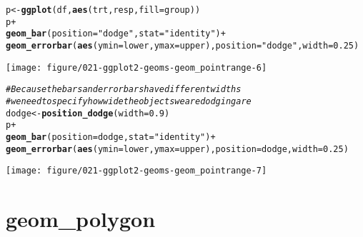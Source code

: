 \documentclass[a4paper,titlepage]{tufte-handout}\usepackage[]{graphicx}\usepackage[]{color}
\makeatletter
\def\maxwidth{ %
  \ifdim\Gin@nat@width>\linewidth
    \linewidth
  \else
    \Gin@nat@width
  \fi
}
\newcommand{\hlnum}[1]{\textcolor[rgb]{0.686,0.059,0.569}{#1}}%
\newcommand{\hlstr}[1]{\textcolor[rgb]{0.192,0.494,0.8}{#1}}%
\newcommand{\hlcom}[1]{\textcolor[rgb]{0.678,0.584,0.686}{\textit{#1}}}%
\newcommand{\hlopt}[1]{\textcolor[rgb]{0,0,0}{#1}}%
\newcommand{\hlstd}[1]{\textcolor[rgb]{0.345,0.345,0.345}{#1}}%
\newcommand{\hlkwb}[1]{\textcolor[rgb]{0.69,0.353,0.396}{#1}}%
\newcommand{\hlkwc}[1]{\textcolor[rgb]{0.333,0.667,0.333}{#1}}%
\newcommand{\hlkwd}[1]{\textcolor[rgb]{0.737,0.353,0.396}{\textbf{#1}}}%
\newenvironment{kframe}{%
 \def\at@end@of@kframe{}%
 \ifinner\ifhmode%
  \def\at@end@of@kframe{\end{minipage}}%
  \begin{minipage}{\columnwidth}%
 \fi\fi%
 \def\FrameCommand##1{\hskip\@totalleftmargin \hskip-\fboxsep
 \colorbox{shadecolor}{##1}\hskip-\fboxsep
     \hskip-\linewidth \hskip-\@totalleftmargin \hskip\columnwidth}%
 \MakeFramed {\advance\hsize-\width
   \@totalleftmargin\z@ \linewidth\hsize
   \@setminipage}}%
 {\par\unskip\endMakeFramed%
 \at@end@of@kframe}
\newenvironment{knitrout}{}{} %
\makeatother
\begin{document}
\begin{knitrout}
\begin{kframe}
\begin{alltt}
\hlstd{p} \hlkwb{<-} \hlkwd{ggplot}\hlstd{(df,} \hlkwd{aes}\hlstd{(trt, resp,} \hlkwc{fill} \hlstd{= group))}
\hlstd{p} \hlopt{+}
 \hlkwd{geom_bar}\hlstd{(}\hlkwc{position} \hlstd{=} \hlstr{"dodge"}\hlstd{,} \hlkwc{stat} \hlstd{=} \hlstr{"identity"}\hlstd{)} \hlopt{+}
 \hlkwd{geom_errorbar}\hlstd{(}\hlkwd{aes}\hlstd{(}\hlkwc{ymin} \hlstd{= lower,} \hlkwc{ymax} \hlstd{= upper),} \hlkwc{position} \hlstd{=} \hlstr{"dodge"}\hlstd{,} \hlkwc{width} \hlstd{=} \hlnum{0.25}\hlstd{)}
\end{alltt}
\end{kframe}
\texttt{[image: figure/021-ggplot2-geoms-geom\_pointrange-6]} 
\begin{kframe}\begin{alltt}
\hlcom{# Because the bars and errorbars have different widths}
\hlcom{# we need to specify how wide the objects we are dodging are}
\hlstd{dodge} \hlkwb{<-} \hlkwd{position_dodge}\hlstd{(}\hlkwc{width}\hlstd{=}\hlnum{0.9}\hlstd{)}
\hlstd{p} \hlopt{+}
  \hlkwd{geom_bar}\hlstd{(}\hlkwc{position} \hlstd{= dodge,} \hlkwc{stat} \hlstd{=} \hlstr{"identity"}\hlstd{)} \hlopt{+}
  \hlkwd{geom_errorbar}\hlstd{(}\hlkwd{aes}\hlstd{(}\hlkwc{ymin} \hlstd{= lower,} \hlkwc{ymax} \hlstd{= upper),} \hlkwc{position} \hlstd{= dodge,} \hlkwc{width} \hlstd{=} \hlnum{0.25}\hlstd{)}
\end{alltt}
\end{kframe}
\texttt{[image: figure/021-ggplot2-geoms-geom\_pointrange-7]} 

\end{knitrout}


\section{geom\_polygon}
\end{document}
